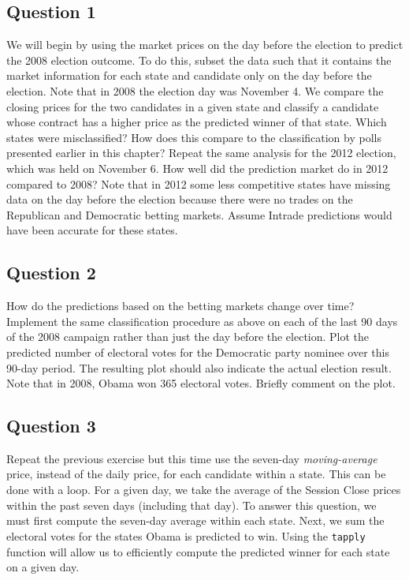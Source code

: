 \documentclass[]{article}
\begin{document}
\subsection{Question 1}\label{question-1}

We will begin by using the market prices on the day before the election
to predict the 2008 election outcome. To do this, subset the data such
that it contains the market information for each state and candidate
only on the day before the election. Note that in 2008 the election day
was November 4. We compare the closing prices for the two candidates in
a given state and classify a candidate whose contract has a higher price
as the predicted winner of that state. Which states were misclassified?
How does this compare to the classification by polls presented earlier
in this chapter? Repeat the same analysis for the 2012 election, which
was held on November 6. How well did the prediction market do in 2012
compared to 2008? Note that in 2012 some less competitive states have
missing data on the day before the election because there were no trades
on the Republican and Democratic betting markets. Assume Intrade
predictions would have been accurate for these states.

\subsection{Question 2}\label{question-2}

How do the predictions based on the betting markets change over time?
Implement the same classification procedure as above on each of the last
90 days of the 2008 campaign rather than just the day before the
election. Plot the predicted number of electoral votes for the
Democratic party nominee over this 90-day period. The resulting plot
should also indicate the actual election result. Note that in 2008,
Obama won 365 electoral votes. Briefly comment on the plot.

\subsection{Question 3}\label{question-3}

Repeat the previous exercise but this time use the seven-day
\emph{moving-average} price, instead of the daily price, for each
candidate within a state. This can be done with a loop. For a given day,
we take the average of the Session Close prices within the past seven
days (including that day). To answer this question, we must first
compute the seven-day average within each state. Next, we sum the
electoral votes for the states Obama is predicted to win. Using the
\texttt{tapply} function will allow us to efficiently compute the
predicted winner for each state on a given day.
\end{document}
